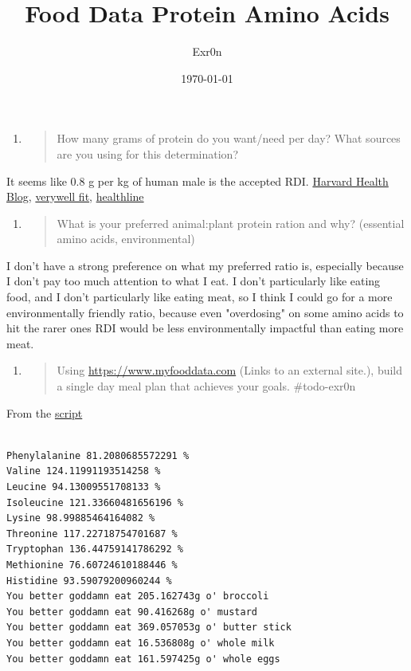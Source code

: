 \documentclass[letterpaper]{article}
\author{Exr0n}
\date{\today}
\title{Food Data Protein Amino Acids}
\renewcommand{\tableofcontents}{}
\begin{document}
\tableofcontents

\begin{enumerate}
\item \begin{quote}
How many grams of protein do you want/need per day? What sources
are you using for this determination?
\end{quote}
\end{enumerate}

It seems like 0.8 g per kg of human male is the accepted RDI.
\href{https://www.health.harvard.edu/blog/how-much-protein-do-you-need-every-day-201506188096}{Harvard
Health Blog},
\href{https://www.verywellfit.com/how-to-calculate-how-much-protein-you-need-3955709}{verywell
fit},
\href{https://www.healthline.com/nutrition/how-much-protein-per-day}{healthline}

\begin{enumerate}
\item \begin{quote}
What is your preferred animal:plant protein ration and why?
(essential amino acids, environmental)
\end{quote}
\end{enumerate}

I don't have a strong preference on what my preferred ratio is,
especially because I don't pay too much attention to what I eat. I don't
particularly like eating food, and I don't particularly like eating
meat, so I think I could go for a more environmentally friendly ratio,
because even "overdosing" on some amino acids to hit the rarer ones RDI
would be less environmentally impactful than eating more meat.

\begin{enumerate}
\item \begin{quote}
Using \url{https://www.myfooddata.com} (Links to an external site.),
build a single day meal plan that achieves your goals. \#todo-exr0n
\end{quote}
\end{enumerate}

From the
\href{https://github.com/SkoolNotes/diet-finder8000superplus}{script}

\begin{verbatim}

Phenylalanine 81.2080685572291 %
Valine 124.11991193514258 %
Leucine 94.13009551708133 %
Isoleucine 121.33660481656196 %
Lysine 98.99885464164082 %
Threonine 117.22718754701687 %
Tryptophan 136.44759141786292 %
Methionine 76.60724610188446 %
Histidine 93.59079200960244 %
You better goddamn eat 205.162743g o' broccoli
You better goddamn eat 90.416268g o' mustard
You better goddamn eat 369.057053g o' butter stick
You better goddamn eat 16.536808g o' whole milk
You better goddamn eat 161.597425g o' whole eggs
\end{verbatim}
\end{document}
